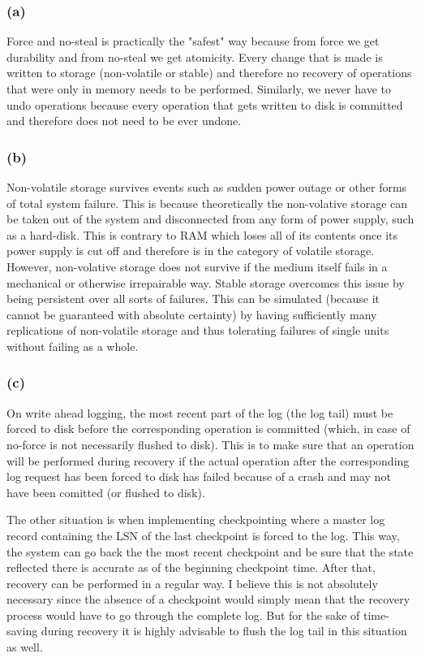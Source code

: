 \documentclass[a4paper,11pt]{article}
\begin{document}
\subsubsection*{(a)}
Force and no-steal is practically the "safest" way because from force we get durability and from no-steal we get atomicity. Every change that is made is written to storage (non-volatile or stable) and therefore no recovery of operations that were only in memory needs to be performed. Similarly, we never have to undo operations because every operation that gets written to disk is committed and therefore does not need to be ever undone.

\subsubsection*{(b)}
Non-volatile storage survives events such as sudden power outage or other forms of total system failure. This is because theoretically the non-volative storage can be taken out of the system and disconnected from any form of power supply, such as a hard-disk. This is contrary to RAM which loses all of its contents once its power supply is cut off and therefore is in the category of volatile storage. However, non-volative storage does not survive if the medium itself fails in a mechanical or otherwise irrepairable way. Stable storage overcomes this issue by being persistent over all sorts of failures. This can be simulated (because it cannot be guaranteed with absolute certainty) by having sufficiently many replications of non-volatile storage and thus tolerating failures of single units without failing as a whole.

\subsubsection*{(c)}
On write ahead logging, the most recent part of the log (the log tail) must be forced to disk before the corresponding operation is committed (which, in case of no-force is not necessarily flushed to disk). This is to make sure that an operation will be performed during recovery if the actual operation after the corresponding log request has been forced to disk has failed because of a crash and may not have been comitted (or flushed to disk).

The other situation is when implementing checkpointing where a master log record containing the LSN of the last checkpoint is forced to the log. This way, the system can go back the the most recent checkpoint and be sure that the state reflected there is accurate as of the beginning checkpoint time. After that, recovery can be performed in a regular way. I believe this is not absolutely necessary since the absence of a checkpoint would simply mean that the recovery process would have to go through the complete log. But for the sake of time-saving during recovery it is highly advisable to flush the log tail in this situation as well.
\end{document}
